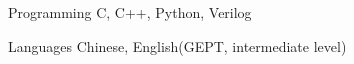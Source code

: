 

\begin{cvskills}




  \cvskill
    {Programming} %
    {C, C++, Python, Verilog} %

  \cvskill
    {Languages} %
    {Chinese, English(GEPT, intermediate level)} %

\end{cvskills}
